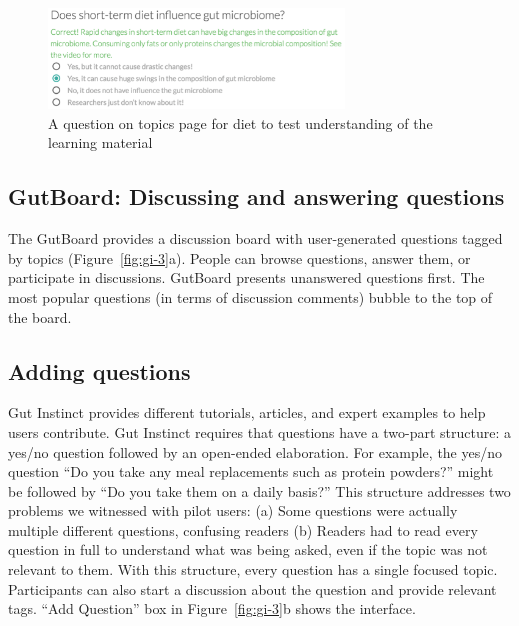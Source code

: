 \begin{figure}[h]
  \centering
  \includegraphics[width=0.7\textwidth]{figures/gutinstinct/gi-4.png}
  \caption[A question on topics page for diet]
{A question on topics page for diet to test understanding of the learning material }
  \label{fig:gi-4}
\end{figure} 

\subsection{GutBoard: Discussing and answering questions}
The GutBoard provides a discussion board with user-generated questions tagged by topics (Figure~\ref{fig:gi-3}a). People can browse questions, answer them, or participate in discussions. GutBoard presents unanswered questions first. The most popular questions (in terms of discussion comments) bubble to the top of the board.
 
\subsection{Adding questions}
Gut Instinct provides different tutorials, articles, and expert examples to help users contribute. Gut Instinct requires that questions have a two-part structure: a yes/no question followed by an open-ended elaboration. For example, the yes/no question “Do you take any meal replacements such as protein powders?” might be followed by “Do you take them on a daily basis?” This structure addresses two problems we witnessed with pilot users: (a) Some questions were actually multiple different questions, confusing readers (b) Readers had to read every question in full to understand what was being asked, even if the topic was not relevant to them. With this structure, every question has a single focused topic. Participants can also start a discussion about the question and provide relevant tags. “Add Question” box in Figure~\ref{fig:gi-3}b shows the interface.

